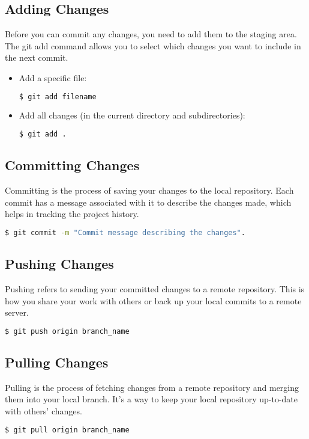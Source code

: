 \documentclass[10pt,twocolumn]{article}
\begin{document}
\subsection{Adding Changes}
Before you can commit any changes, you need to add them to the staging area. The git add command allows you to select which changes you want to include in the next commit.
\begin{itemize}
    \item Add a specific file:
    \begin{lstlisting}[language=bash]
    $ git add filename
    \end{lstlisting}
    \item Add all changes (in the current directory and subdirectories):
    \begin{lstlisting}[language=bash]
    $ git add .
    \end{lstlisting}
\end{itemize}

\subsection{Committing Changes}
Committing is the process of saving your changes to the local repository. Each commit has a message associated with it to describe the changes made, which helps in tracking the project history.
\begin{lstlisting}[language=bash]
    $ git commit -m "Commit message describing the changes".
    \end{lstlisting}

\subsection{Pushing Changes}
Pushing refers to sending your committed changes to a remote repository. This is how you share your work with others or back up your local commits to a remote server.
\begin{lstlisting}[language=bash]
    $ git push origin branch_name
    \end{lstlisting}


\subsection{Pulling Changes}
Pulling is the process of fetching changes from a remote repository and merging them into your local branch. It's a way to keep your local repository up-to-date with others' changes.
\begin{lstlisting}[language=bash]
    $ git pull origin branch_name
    \end{lstlisting}
\end{document}
